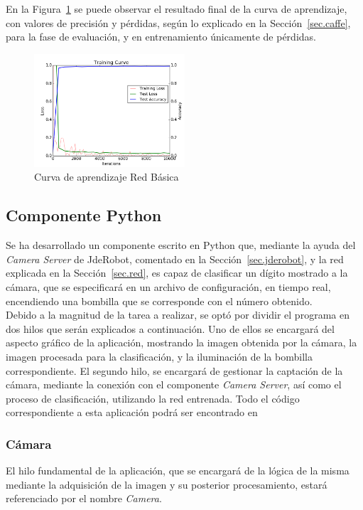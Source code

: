 	En la Figura~\ref{fig.Log} se puede observar el resultado final de la curva de aprendizaje, con valores de precisión y pérdidas, según lo explicado en la Sección~\ref{sec.caffe}, para la fase de evaluación, y en entrenamiento únicamente de pérdidas.
	
	\begin{figure}[H]
		\begin{center}
			\includegraphics[width=0.5\textwidth]{figures/RedBasicaLog}
			\caption{Curva de aprendizaje Red Básica}
			\label{fig.Log}
		\end{center}
	\end{figure}

\subsection{Componente Python}
Se ha desarrollado un componente escrito en Python que, mediante la ayuda del \textit{Camera Server} de JdeRobot, comentado en la Sección~\ref{sec.jderobot},  y la red explicada en la Sección~\ref{sec.red}, es capaz de clasificar un dígito mostrado a la cámara, que se especificará en un archivo de configuración, en tiempo real, encendiendo una bombilla que se corresponde con el número obtenido.\\

Debido a la magnitud de la tarea a realizar, se optó por dividir el programa en dos hilos que serán explicados a continuación. Uno de ellos se encargará del aspecto gráfico de la aplicación, mostrando la imagen obtenida por la cámara, la imagen procesada para la clasificación, y la iluminación de la bombilla correspondiente. El segundo hilo, se encargará de gestionar la captación de la cámara, mediante la conexión con el componente \textit{Camera Server}, así como el proceso de clasificación, utilizando la red entrenada. Todo el código correspondiente a esta aplicación podrá ser encontrado en 
\subsubsection{Cámara} \label{sec.camara}
El hilo fundamental de la aplicación, que se encargará de la lógica de la misma mediante la adquisición de la imagen y su posterior procesamiento, estará referenciado por el nombre \textit{Camera}.\\


